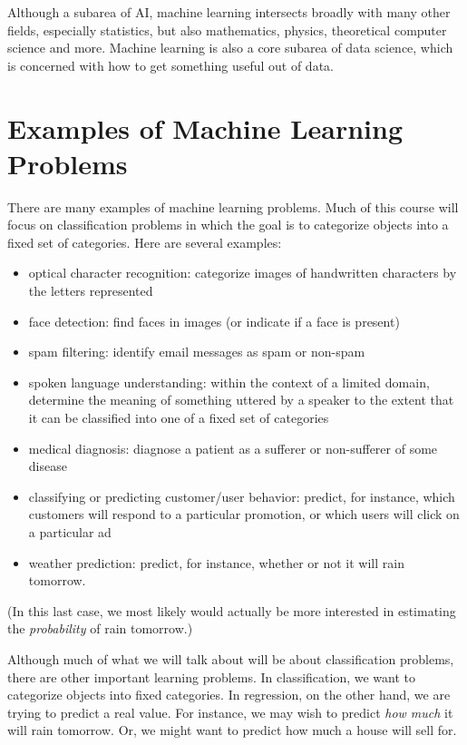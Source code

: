 \documentclass[11pt]{article}
\begin{document}
Although a subarea of AI, machine learning intersects broadly
with many other fields, especially statistics, but also mathematics,
physics, theoretical computer science and more.
Machine learning is also a core subarea of data science, which is
concerned with how to get something useful out of data.


\section{Examples of Machine Learning Problems}

There are many examples of machine learning problems.
Much of this course will focus on classification problems in which the
goal is to categorize objects into a fixed set of categories.
Here are several examples:

\begin{itemize}
\item
optical character recognition: categorize images of handwritten
characters by the letters represented
\item
face detection: find faces in images (or indicate if a face is present)
\item
spam filtering: identify email messages as spam or non-spam
\item
spoken language understanding: within the context of a limited domain,
determine the meaning of something uttered by a speaker to the extent
that it can be classified into one of a fixed set of categories
\item
medical diagnosis: diagnose a patient as a sufferer or non-sufferer of
some disease
\item
classifying or predicting customer/user behavior: predict, for
instance, which customers will respond to a particular promotion, or
which users will click on a particular ad
\item
weather prediction: predict, for instance, whether or not it will rain
tomorrow.
\end{itemize}
(In this last case, we most likely would actually be more interested in
estimating the {\em probability} of rain tomorrow.)

Although much of what we will talk about will be about classification
problems, there are other important learning problems.
In classification, we want to categorize objects into fixed
categories.
In regression, on the other hand, we are trying to predict a real
value.
For instance, we may wish to predict {\em how much} it will rain
tomorrow.
Or, we might want to predict how much a house will sell for.
\end{document}

